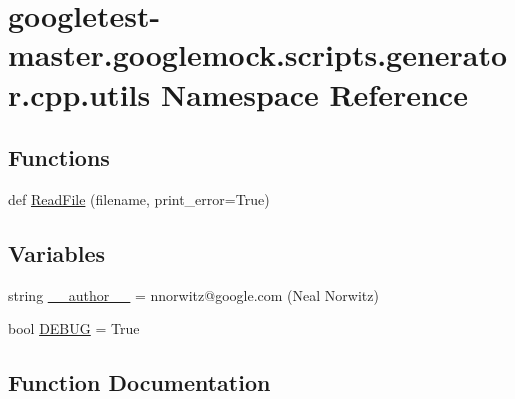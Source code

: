 \hypertarget{namespacegoogletest-master_1_1googlemock_1_1scripts_1_1generator_1_1cpp_1_1utils}{}\section{googletest-\/master.googlemock.\+scripts.\+generator.\+cpp.\+utils Namespace Reference}
\label{namespacegoogletest-master_1_1googlemock_1_1scripts_1_1generator_1_1cpp_1_1utils}
\subsection*{Functions}
\begin{DoxyCompactItemize}
\item 
def \mbox{\hyperlink{namespacegoogletest-master_1_1googlemock_1_1scripts_1_1generator_1_1cpp_1_1utils_ad4ab88b845b6ae790c3045ee515d7a8e}{Read\+File}} (filename, print\+\_\+error=True)
\end{DoxyCompactItemize}
\subsection*{Variables}
\begin{DoxyCompactItemize}
\item 
string \mbox{\hyperlink{namespacegoogletest-master_1_1googlemock_1_1scripts_1_1generator_1_1cpp_1_1utils_a2bc2491421940b8ca4f8ab971677949e}{\+\_\+\+\_\+author\+\_\+\+\_\+}} = \textquotesingle{}nnorwitz@google.\+com (Neal Norwitz)\textquotesingle{}
\item 
bool \mbox{\hyperlink{namespacegoogletest-master_1_1googlemock_1_1scripts_1_1generator_1_1cpp_1_1utils_a08988e3ca9442879c3f024b727b62d68}{D\+E\+B\+UG}} = True
\end{DoxyCompactItemize}


\subsection{Function Documentation}
\mbox{\label{namespacegoogletest-master_1_1googlemock_1_1scripts_1_1generator_1_1cpp_1_1utils_ad4ab88b845b6ae790c3045ee515d7a8e}} 
